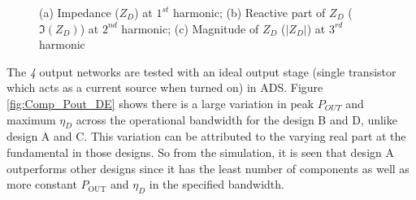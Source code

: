 \documentclass[conference]{IEEEtran}
\begin{document}
\begin{figure}[!t]
\begin{subfigure}{0.24\textwidth}
\caption{}
\label{fig:Comp_3H_Mag}
\end{subfigure}
\caption{(a) Impedance ($Z_D$) at $1^{st}$ harmonic; (b) Reactive part of $Z_D$ ($\Im(Z_D)$) at $2^{nd}$ harmonic; (c) Magnitude of $Z_D$ ($|Z_D|$) at $3^{rd}$ harmonic}
\label{fig:Comp_1H_2H_3H}
\vspace{-0.1in}
\end{figure}


The \textit{4} output networks are tested with an ideal output stage (single transistor which acts as a current source when turned on) in ADS. Figure \ref{fig:Comp_Pout_DE} shows there is a large variation in peak $P_{OUT}$ and maximum $\eta_D$ across the operational bandwidth for the design B and D, unlike design A and C. This variation can be attributed to the varying real part at the fundamental in those designs.
So from the simulation, it is seen that design A outperforms other designs since it has the least number of components as well as more constant $P_{\text{OUT}}$ and $\eta_D$ in the specified bandwidth.
\end{document}
